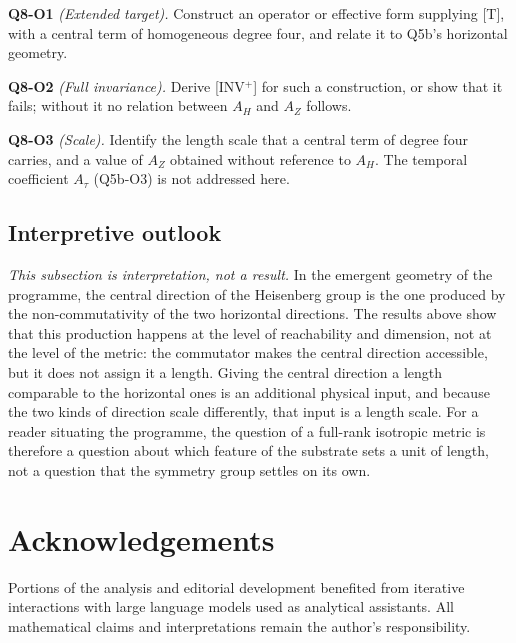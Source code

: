 \documentclass[11pt,a4paper]{article}
\theoremstyle{definition}
\theoremstyle{remark}
\newcommand{\Az}{A_{Z}}
\newcommand{\AH}{A_{H}}
\begin{document}
      \textbf{Q8-O1} \emph{(Extended target).}
      Construct an operator or effective form supplying [T], with a central term of homogeneous degree four, and
      relate it to Q5b's horizontal geometry.

      \textbf{Q8-O2} \emph{(Full invariance).}
      Derive [INV$^+$] for such a construction, or show that it fails; without it no relation between $\AH$ and
      $\Az$ follows.

      \textbf{Q8-O3} \emph{(Scale).}
      Identify the length scale that a central term of degree four carries, and a value of $\Az$ obtained without
      reference to $\AH$.
      The temporal coefficient $A_\tau$ (Q5b-O3) is not addressed here.

    \subsection{Interpretive outlook}

      \emph{This subsection is interpretation, not a result.}
      In the emergent geometry of the programme, the central direction of the Heisenberg group is the one produced by
      the non-commutativity of the two horizontal directions.
      The results above show that this production happens at the level of reachability and dimension, not at the
      level of the metric: the commutator makes the central direction accessible, but it does not assign it a length.
      Giving the central direction a length comparable to the horizontal ones is an additional physical input, and
      because the two kinds of direction scale differently, that input is a length scale.
      For a reader situating the programme, the question of a full-rank isotropic metric is therefore a question
      about which feature of the substrate sets a unit of length, not a question that the symmetry group settles on
      its own.

  \section*{Acknowledgements}

    Portions of the analysis and editorial development benefited from iterative interactions with large language
    models used as analytical assistants.
    All mathematical claims and interpretations remain the author's responsibility.

  \clearpage
  {\raggedright
  
  }
\end{document}
